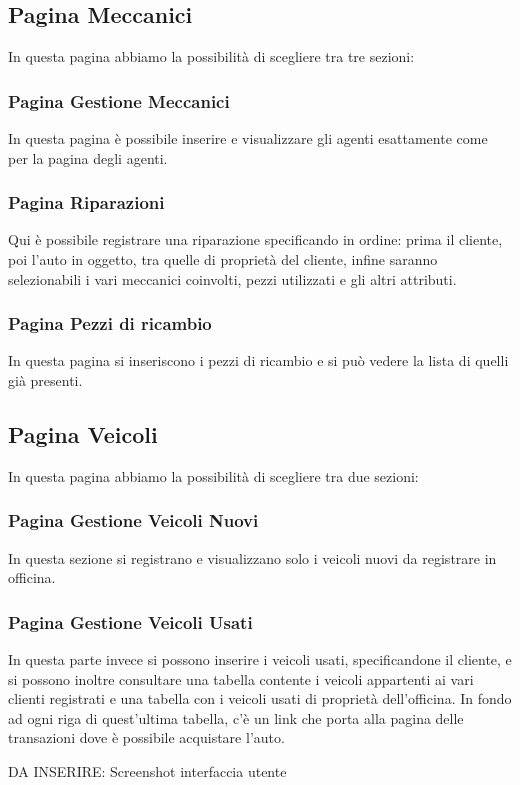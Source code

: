 \documentclass[a4paper,12pt]{report}
\begin{document}
\subsection*{Pagina Meccanici}
In questa pagina abbiamo la possibilità di scegliere tra tre sezioni:

\subsubsection*{Pagina Gestione Meccanici}
In questa pagina è possibile inserire e visualizzare gli agenti esattamente come per la pagina degli agenti.

\subsubsection*{Pagina Riparazioni}
Qui è possibile registrare una riparazione specificando in ordine: prima il cliente, poi l'auto in oggetto, tra quelle 
%
di proprietà del cliente, infine saranno selezionabili i vari meccanici coinvolti, pezzi utilizzati e gli altri attributi.

\subsubsection*{Pagina Pezzi di ricambio}
In questa pagina si inseriscono i pezzi di ricambio e si può vedere la lista di quelli già presenti.

\subsection*{Pagina Veicoli}
In questa pagina abbiamo la possibilità di scegliere tra due sezioni:

\subsubsection*{Pagina Gestione Veicoli Nuovi}
In questa sezione si registrano e visualizzano solo i veicoli nuovi da registrare in officina.

\subsubsection*{Pagina Gestione Veicoli Usati}
In questa parte invece si possono inserire i veicoli usati, specificandone il cliente, e si possono inoltre 
%
consultare una tabella contente i veicoli appartenti ai vari clienti registrati e una tabella con i veicoli
%
usati di proprietà dell'officina. In fondo ad ogni riga di quest'ultima tabella, c'è un link che porta alla pagina
% 
delle transazioni dove è possibile acquistare l'auto.

DA INSERIRE: Screenshot interfaccia utente
\end{document}
